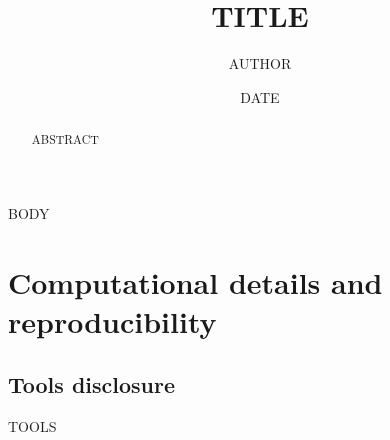 \documentclass[11pt]{amsart}
\title{{{TITLE}}}
\author{{{AUTHOR}}}
\date{{{DATE}}}
\theoremstyle{plain}
\theoremstyle{definition}
\theoremstyle{remark}
\begin{document}
\begin{abstract}
{{ABSTRACT}}
\end{abstract}

\maketitle

{{BODY}}

\section{Computational details and reproducibility}

\subsection{Tools disclosure}
{{TOOLS}}




\end{document}
